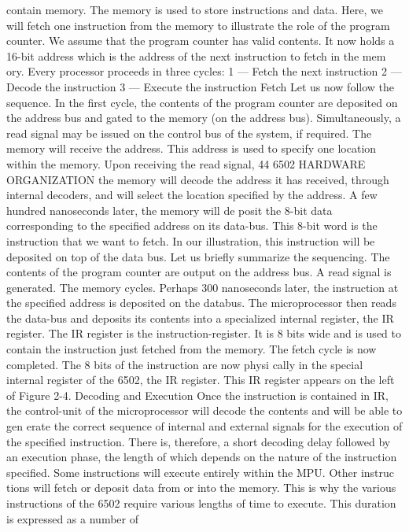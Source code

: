 contain memory. The memory is used to store instructions and
data. Here, we will fetch one instruction from the memory to
illustrate the role of the program counter. We assume that the
program counter has valid contents. It now holds a 16-bit address
which is the address of the next instruction to fetch in the mem
ory. Every processor proceeds in three cycles:
1 — Fetch the next instruction
2 — Decode the instruction
3 — Execute the instruction
Fetch
Let us now follow the sequence. In the first cycle, the contents of
the program counter are deposited on the address bus and gated
to the memory (on the address bus). Simultaneously, a read signal
may be issued on the control bus of the system, if required. The
memory will receive the address. This address is used to specify
one location within the memory. Upon receiving the read signal,
44
6502 HARDWARE ORGANIZATION
the memory will decode the address it has received, through
internal decoders, and will select the location specified by the
address. A few hundred nanoseconds later, the memory will de
posit the 8-bit data corresponding to the specified address on its
data-bus. This 8-bit word is the instruction that we want to fetch.
In our illustration, this instruction will be deposited on top of the
data bus.
Let us briefly summarize the sequencing. The contents of the
program counter are output on the address bus. A read signal is
generated. The memory cycles. Perhaps 300 nanoseconds later,
the instruction at the specified address is deposited on the databus.
The microprocessor then reads the data-bus and deposits its
contents into a specialized internal register, the IR register. The
IR register is the instruction-register. It is 8 bits wide and is used
to contain the instruction just fetched from the memory. The fetch
cycle is now completed. The 8 bits of the instruction are now physi
cally in the special internal register of the 6502, the IR register.
This IR register appears on the left of Figure 2-4.
Decoding and Execution
Once the instruction is contained in IR, the control-unit of the
microprocessor will decode the contents and will be able to gen
erate the correct sequence of internal and external signals for the
execution of the specified instruction. There is, therefore, a short
decoding delay followed by an execution phase, the length of
which depends on the nature of the instruction specified. Some
instructions will execute entirely within the MPU. Other instruc
tions will fetch or deposit data from or into the memory. This is
why the various instructions of the 6502 require various lengths
of time to execute. This duration is expressed as a number of
